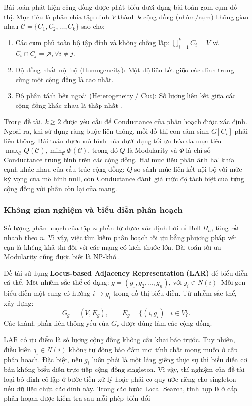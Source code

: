 \documentclass[14pt,a4paper]{extarticle}
\begin{document}
Bài toán phát hiện cộng đồng được phát biểu dưới dạng bài toán gom cụm đồ thị. Mục tiêu là phân chia tập đỉnh $V$ thành $k$ cộng đồng (nhóm/cụm) không giao nhau $\mathcal{C} = \{C_1, C_2, \dots, C_k\}$ \cite{Taillard2023} sao cho:
\begin{enumerate}
    \item Các cụm phủ toàn bộ tập đỉnh và không chồng lấp: $\bigcup_{i=1}^{k} C_i = V$ và $C_i \cap C_j = \varnothing, \forall i \neq j$.
    \item Độ đồng nhất nội bộ (Homogeneity): Mật độ liên kết giữa các đỉnh trong cùng một cộng đồng là cao nhất.
    \item Độ phân tách bên ngoài (Heterogeneity / Cut): Số lượng liên kết giữa các cộng đồng khác nhau là thấp nhất \cite{Taillard2023}.
\end{enumerate}

Trong đề tài, $k\ge 2$ được yêu cầu để Conductance của phân hoạch được xác định. Ngoài ra, khi sử dụng ràng buộc liên thông, mỗi đồ thị con cảm sinh $G[C_i]$ phải liên thông.
Bài toán được mô hình hóa dưới dạng tối ưu hóa đa mục tiêu $\max_{\mathcal{C}} Q(\mathcal{C}), \min_{\mathcal{C}} \Phi(\mathcal{C})$, trong đó $Q$ là Modularity và $\Phi$ là chỉ số Conductance trung bình trên các cộng đồng. Hai mục tiêu phản ánh hai khía cạnh khác nhau của cấu trúc cộng đồng: $Q$ so sánh mức liên kết nội bộ với mức kỳ vọng của mô hình null, còn Conductance đánh giá mức độ tách biệt của từng cộng đồng với phần còn lại của mạng.

\subsubsection{Không gian nghiệm và biểu diễn phân hoạch}

Số lượng phân hoạch của tập $n$ phần tử được xác định bởi số Bell $B_n$, tăng rất nhanh theo $n$. Vì vậy, việc tìm kiếm phân hoạch tối ưu bằng phương pháp vét cạn là không khả thi đối với các mạng có kích thước lớn. Bài toán tối ưu Modularity cũng được biết là NP-khó \cite{Fortunato2010}.


Đề tài sử dụng \textbf{Locus-based Adjacency Representation (LAR)} để biểu diễn cá thể. Một nhiễm sắc thể có dạng:
$g=(g_1,g_2,\ldots,g_n)$, với $g_i\in N(i)$. Mỗi gen biểu diễn một cung có hướng $i\rightarrow g_i$ trong đồ thị biểu diễn. Từ nhiễm sắc thể, xây dựng:
\[
G_g=(V,E_g),\qquad
E_g=\{(i,g_i)\mid i\in V\}.
\]
Các thành phần liên thông yếu của $G_g$ được dùng làm các cộng đồng.

LAR có ưu điểm là số lượng cộng đồng không cần khai báo trước. Tuy nhiên, điều kiện $g_i\in N(i)$ không tự động bảo đảm mọi tính chất mong muốn ở cấp phân hoạch. Đặc biệt, nếu $g_i$ luôn phải là một láng giềng thực sự thì biểu diễn cơ bản không biểu diễn trực tiếp cộng đồng singleton. Vì vậy, thí nghiệm của đề tài loại bỏ đỉnh cô lập ở bước tiền xử lý hoặc phải có quy ước riêng cho singleton nếu dữ liệu chứa các đỉnh này. Trong các bước Local Search, tính hợp lệ ở cấp phân hoạch được kiểm tra sau mỗi phép biến đổi.
\end{document}
